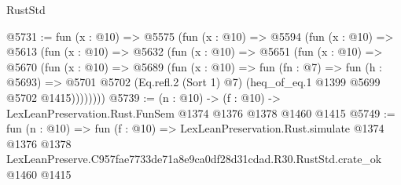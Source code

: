 \begin{lexlean}{RustStd}
\begin{coremodule}
@5731 := fun (x : @10) =>
  @5575
    (fun (x : @10) =>
    @5594
      (fun (x : @10) =>
      @5613
        (fun (x : @10) =>
        @5632
          (fun (x : @10) =>
          @5651
            (fun (x : @10) =>
            @5670
              (fun (x : @10) =>
              @5689
                (fun (x : @10) =>
                fun (fn : @7) =>
                fun (h : @5693) =>
                @5701 @5702 (Eq.refl.{2} (Sort 1) @7) (heq_of_eq.{1} @1399 @5699 @5702 @1415))))))))
@5739 := (n : @10) -> (f : @10) -> LexLeanPreservation.Rust.FunSem @1374 @1376 @1378 @1460 @1415
@5749 := fun (n : @10) =>
  fun (f : @10) =>
  LexLeanPreservation.Rust.simulate
    @1374
    @1376
    @1378
    LexLeanPreserve.C957fae7733de71a8e9ca0df28d31cdad.R30.RustStd.crate_ok
    @1460
    @1415
\end{coremodule}
\end{lexlean}
